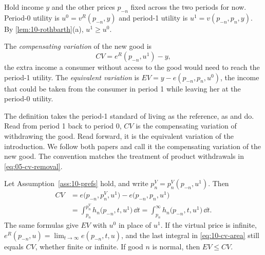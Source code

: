 Hold income $y$ and the other prices $p_{-n}$ fixed across the two periods for now. Period-0 utility is
$u^0 = v^R(p_{-n},y)$ and period-1 utility is $u^1 = v(p_{-n},p_n,y)$. By \cref{lem:10-rothbarth}(a),
$u^1 \ge u^0$.

\begin{definition}\label{def:10-cv}
The \emph{compensating variation} of the new good is
\begin{equation}\label{eq:10-cv-def}
  CV = e^R(p_{-n},u^1) - y,
\end{equation}
the extra income a consumer without access to the good would need to reach the period-1 utility. The
\emph{equivalent variation} is $EV = y - e(p_{-n},p_n,u^0)$, the income that could be taken from the
consumer in period 1 while leaving her at the period-0 utility.
\end{definition}

The definition takes the period-1 standard of living as the reference, as \citet[eqs.~3--4]{Hausman1997} and
\citet[p.~720]{Petrin2002} do. Read from period 1 back to period 0, $CV$ is the compensating variation of
withdrawing the good. Read forward, it is the equivalent variation of the introduction. We follow both papers
and call it the compensating variation of the new good. The convention matches the treatment of product
withdrawals in \eqref{eq:05-cv-removal}.

\begin{proposition}\label{prop:10-cv-newgood}
Let Assumption~\ref{ass:10-prefs} hold, and write $p_n^V = p_n^V(p_{-n},u^1)$. Then
\begin{align}
  CV &= e\bigl(p_{-n},p_n^V,u^1\bigr) - e\bigl(p_{-n},p_n,u^1\bigr) \label{eq:10-cv-e}\\
     &= \int_{p_n}^{p_n^V} h_n\bigl(p_{-n},t,u^1\bigr)\,\dd t
      = \int_{p_n}^{\infty} h_n\bigl(p_{-n},t,u^1\bigr)\,\dd t. \label{eq:10-cv-area}
\end{align}
The same formulas give $EV$ with $u^0$ in place of $u^1$. If the virtual price is infinite,
$e^R(p_{-n},u) = \lim_{t\to\infty}e(p_{-n},t,u)$, and the last integral in \eqref{eq:10-cv-area} still equals
$CV$, whether finite or infinite. If good $n$ is normal, then $EV \le CV$.
\end{proposition}

